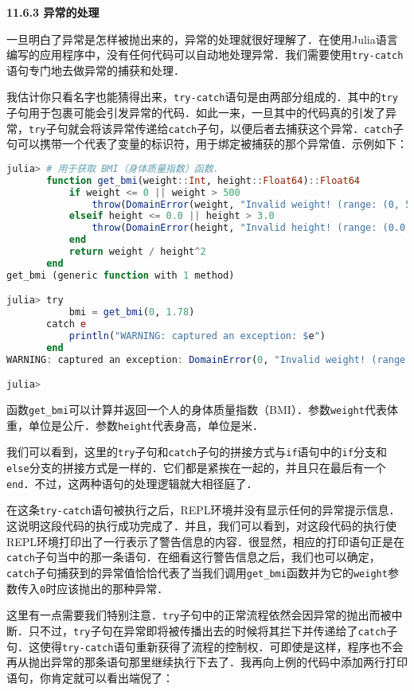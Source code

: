\textbf{11.6.3 异常的处理}

一旦明白了异常是怎样被抛出来的，异常的处理就很好理解了．在使用Julia语言编写的应用程序中，没有任何代码可以自动地处理异常．我们需要使用\verb|try-catch|语句专门地去做异常的捕获和处理．

我估计你只看名字也能猜得出来，\verb|try-catch|语句是由两部分组成的．其中的\verb|try|子句用于包裹可能会引发异常的代码．如此一来，一旦其中的代码真的引发了异常，\verb|try|子句就会将该异常传递给\verb|catch|子句，以便后者去捕获这个异常．\verb|catch|子句可以携带一个代表了变量的标识符，用于绑定被捕获的那个异常值．示例如下：

\begin{lstlisting}[language=julia]
julia> # 用于获取 BMI（身体质量指数）函数．
       function get_bmi(weight::Int, height::Float64)::Float64
           if weight <= 0 || weight > 500
               throw(DomainError(weight, "Invalid weight! (range: (0, 500])"))
           elseif height <= 0.0 || height > 3.0
               throw(DomainError(height, "Invalid height! (range: (0.0, 3.0])"))
           end
           return weight / height^2
       end
get_bmi (generic function with 1 method)

julia> try 
           bmi = get_bmi(0, 1.78)
       catch e
           println("WARNING: captured an exception: $e")
       end
WARNING: captured an exception: DomainError(0, "Invalid weight! (range: (0, 500])")

julia> 
\end{lstlisting}

函数\verb|get_bmi|可以计算并返回一个人的身体质量指数（BMI）．参数\verb|weight|代表体重，单位是公斤．参数\verb|height|代表身高，单位是米．

我们可以看到，这里的\verb|try|子句和\verb|catch|子句的拼接方式与\verb|if|语句中的\verb|if|分支和\verb|else|分支的拼接方式是一样的．它们都是紧挨在一起的，并且只在最后有一个\verb|end|．不过，这两种语句的处理逻辑就大相径庭了．

在这条\verb|try-catch|语句被执行之后，REPL环境并没有显示任何的异常提示信息．这说明这段代码的执行成功完成了．并且，我们可以看到，对这段代码的执行使REPL环境打印出了一行表示了警告信息的内容．很显然，相应的打印语句正是在\verb|catch|子句当中的那一条语句．在细看这行警告信息之后，我们也可以确定，\verb|catch|子句捕获到的异常值恰恰代表了当我们调用\verb|get_bmi|函数并为它的\verb|weight|参数传入\verb|0|时应该抛出的那种异常．

这里有一点需要我们特别注意．\verb|try|子句中的正常流程依然会因异常的抛出而被中断．只不过，\verb|try|子句在异常即将被传播出去的时候将其拦下并传递给了\verb|catch|子句．这使得\verb|try-catch|语句重新获得了流程的控制权．可即使是这样，程序也不会再从抛出异常的那条语句那里继续执行下去了．我再向上例的代码中添加两行打印语句，你肯定就可以看出端倪了：

